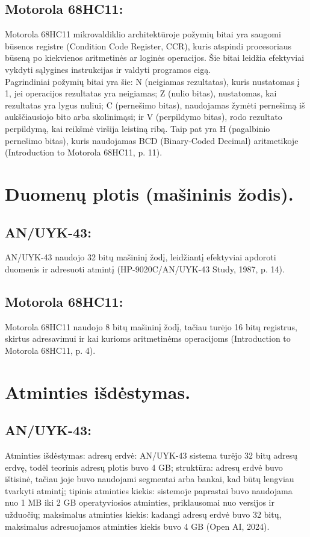 \documentclass[a4paper,12pt]{article}
\begin{document}
\subsection{Motorola 68HC11:}
Motorola 68HC11 mikrovaldiklio architektūroje požymių bitai yra saugomi būsenos registre (Condition Code Register, CCR), kuris atspindi procesoriaus būseną po kiekvienos aritmetinės ar loginės operacijos. Šie bitai leidžia efektyviai vykdyti sąlygines instrukcijas ir valdyti programos eigą.\\
Pagrindiniai požymių bitai yra šie: N (neigiamas rezultatas), kuris nustatomas į 1, jei operacijos rezultatas yra neigiamas; Z (nulio bitas), nustatomas, kai rezultatas yra lygus nuliui; C (pernešimo bitas), naudojamas žymėti pernešimą iš aukščiausiojo bito arba skolinimąsi; ir V (perpildymo bitas), rodo rezultato perpildymą, kai reikšmė viršija leistiną ribą. Taip pat yra H (pagalbinio pernešimo bitas), kuris naudojamas BCD (Binary-Coded Decimal) aritmetikoje (Introduction to Motorola 68HC11, p. 11).

\section{Duomenų plotis (mašininis žodis).}
\subsection{AN/UYK-43:}
AN/UYK-43 naudojo 32 bitų mašininį žodį, leidžiantį efektyviai apdoroti duomenis ir adresuoti atmintį (HP-9020C/AN/UYK-43 Study, 1987, p. 14).
\subsection{Motorola 68HC11:}
Motorola 68HC11 naudojo 8 bitų mašininį žodį, tačiau turėjo 16 bitų registrus, skirtus adresavimui ir kai kurioms aritmetinėms operacijoms (Introduction to Motorola 68HC11, p. 4).

\section{Atminties išdėstymas.}
\subsection{AN/UYK-43:}
Atminties išdėstymas: adresų erdvė: AN/UYK-43 sistema turėjo 32 bitų adresų erdvę, todėl teorinis adresų plotis buvo 4 GB; struktūra: adresų erdvė buvo ištisinė, tačiau joje buvo naudojami segmentai arba bankai, kad būtų lengviau tvarkyti atmintį; tipinis atminties kiekis: sistemoje paprastai buvo naudojama nuo 1 MB iki 2 GB operatyviosios atminties, priklausomai nuo versijos ir užduočių; maksimalus atminties kiekis: kadangi adresų erdvė buvo 32 bitų, maksimalus adresuojamos atminties kiekis buvo 4 GB (Open AI, 2024).
\end{document}

